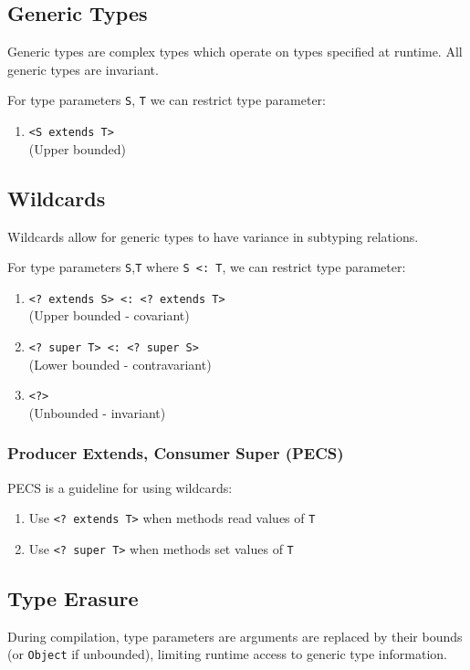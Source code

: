 \documentclass[12pt, a4paper]{article}
\begin{document}
\begin{multicols*}{3}
\section{Generic Types}
Generic types are complex types which operate on types specified at runtime. All generic types are invariant.

For type parameters \lstinline|S|, \lstinline|T| we can restrict type parameter:
\begin{enumerate}[\roman*.]
  \item \lstinline|<S extends T>|\\(Upper bounded)
\end{enumerate}

\subsection{Wildcards}
Wildcards allow for generic types to have variance in subtyping relations.

For type parameters \lstinline|S|,\lstinline|T| where \lstinline|S <: T|, we can restrict type parameter:
\begin{enumerate}[\roman*.]
  \item \lstinline|<? extends S> <: <? extends T>|\\(Upper bounded - covariant)
  \item \lstinline|<? super T> <: <? super S>|\\(Lower bounded - contravariant)
  \item \lstinline|<?>|\\(Unbounded - invariant)
\end{enumerate}

\subsubsection{Producer Extends, Consumer Super (PECS)}
PECS is a guideline for using wildcards:
\begin{enumerate}[\roman*.]
  \item Use \lstinline|<? extends T>| when methods read values of \lstinline|T|
  \item Use \lstinline|<? super T>| when methods set values of \lstinline|T|
\end{enumerate}

\subsection{Type Erasure}
During compilation, type parameters are arguments are replaced by their bounds (or \lstinline|Object| if unbounded), limiting runtime access to generic type information.


\end{multicols*}
\end{document}
